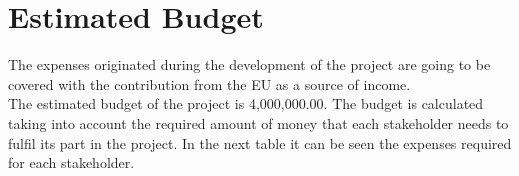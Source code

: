 \section{Estimated Budget}

The expenses originated during the development of the project are going to be covered with the contribution from the EU as a source of income.\\

The estimated budget of the project is 4,000,000.00\EUR . The budget is calculated taking into account the required amount of money that each stakeholder needs to fulfil its part in the project. In the next table it can be seen the expenses required for each stakeholder.

\begin{table}[H]
\centering
\caption{Breakdown of the project budget (units in euros).}
\label{my-label}
\end{table}

